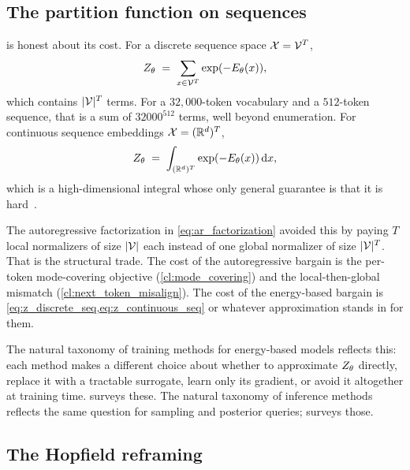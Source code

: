 \subsection{The partition function on sequences}
\label{ssec:partition_obstacle}

 is honest about its cost.
For a discrete sequence space $\mathcal{X} = \mathcal{V}^T$,
\begin{equation}
  Z_\theta \;=\; \sum_{x \in \mathcal{V}^T} \exp(-E_\theta(x)),
  \label{eq:z_discrete_seq}
\end{equation}
which contains $|\mathcal{V}|^T$ terms.
For a $32{,}000$-token vocabulary and a $512$-token sequence, that is a sum of $32000^{512}$ terms, well beyond enumeration.
For continuous sequence embeddings $\mathcal{X} = (\mathbb{R}^d)^T$,
\begin{equation}
  Z_\theta \;=\; \int_{(\mathbb{R}^d)^T} \exp(-E_\theta(x))\, \mathrm{d}x,
  \label{eq:z_continuous_seq}
\end{equation}
which is a high-dimensional integral whose only general guarantee is that it is hard~\citep{murphy2023advanced}.

The autoregressive factorization in \cref{eq:ar_factorization} avoided this by paying $T$ local normalizers of size $|\mathcal{V}|$ each instead of one global normalizer of size $|\mathcal{V}|^T$.
That is the structural trade.
The cost of the autoregressive bargain is the per-token mode-covering objective (\ref{cl:mode_covering}) and the local-then-global mismatch (\ref{cl:next_token_misalign}).
The cost of the energy-based bargain is \cref{eq:z_discrete_seq,eq:z_continuous_seq} or whatever approximation stands in for them.

The natural taxonomy of training methods for energy-based models reflects this:
each method makes a different choice about whether to approximate $Z_\theta$ directly, replace it with a tractable surrogate, learn only its gradient, or avoid it altogether at training time.
 surveys these.
The natural taxonomy of inference methods reflects the same question for sampling and posterior queries;
 surveys those.

\subsection{The Hopfield reframing}
\label{ssec:hopfield}

